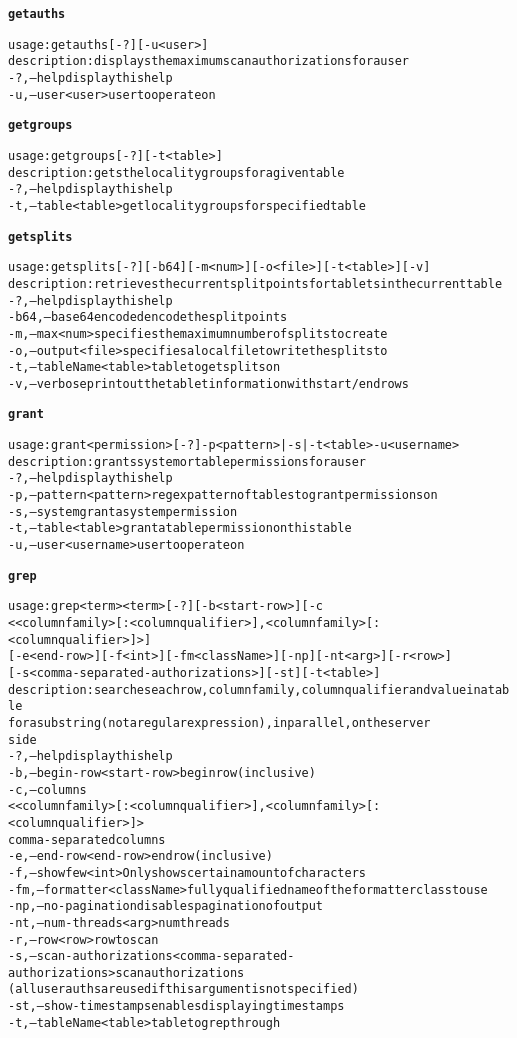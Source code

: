 \begin{alltt}
\textbf{getauths}

    usage: getauths [-?] [-u <user>]
    description: displays the maximum scan authorizations for a user
      -?,--help  display this help
      -u,--user <user>  user to operate on

\textbf{getgroups}

    usage: getgroups [-?] [-t <table>]
    description: gets the locality groups for a given table
      -?,--help  display this help
      -t,--table <table>  get locality groups for specified table

\textbf{getsplits}

    usage: getsplits [-?] [-b64] [-m <num>] [-o <file>] [-t <table>] [-v]
    description: retrieves the current split points for tablets in the current table
      -?,--help  display this help
      -b64,--base64encoded  encode the split points
      -m,--max <num>  specifies the maximum number of splits to create
      -o,--output <file>  specifies a local file to write the splits to
      -t,--tableName <table>  table to get splits on
      -v,--verbose  print out the tablet information with start/end rows

\textbf{grant}

    usage: grant <permission> [-?] -p <pattern> | -s | -t <table>  -u <username>
    description: grants system or table permissions for a user
      -?,--help  display this help
      -p,--pattern <pattern>  regex pattern of tables to grant permissions on
      -s,--system  grant a system permission
      -t,--table <table>  grant a table permission on this table
      -u,--user <username>  user to operate on

\textbf{grep}

    usage: grep <term>{ <term>} [-?] [-b <start-row>] [-c
              <<columnfamily>[:<columnqualifier>]{,<columnfamily>[:<columnqualifier>]}>]
              [-e <end-row>] [-f <int>] [-fm <className>] [-np] [-nt <arg>] [-r <row>]
              [-s <comma-separated-authorizations>] [-st] [-t <table>]
    description: searches each row, column family, column qualifier and value in a table
              for a substring (not a regular expression), in parallel, on the server
              side
      -?,--help  display this help
      -b,--begin-row <start-row>  begin row (inclusive)
      -c,--columns
              <<columnfamily>[:<columnqualifier>]{,<columnfamily>[:<columnqualifier>]}> 
              comma-separated columns
      -e,--end-row <end-row>  end row (inclusive)
      -f,--show few <int>  Only shows certain amount of characters
      -fm,--formatter <className>  fully qualified name of the formatter class to use
      -np,--no-pagination  disables pagination of output
      -nt,--num-threads <arg>  num threads
      -r,--row <row>  row to scan
      -s,--scan-authorizations <comma-separated-authorizations>  scan authorizations
              (all user auths are used if this argument is not specified)
      -st,--show-timestamps  enables displaying timestamps
      -t,--tableName <table>  table to grep through


\end{alltt}
